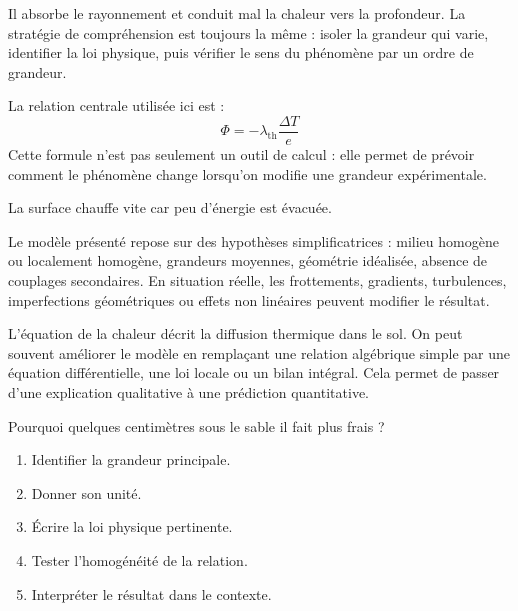 \documentclass[11pt,a4paper]{article}
\begin{document}
\begin{methodebox}
Il absorbe le rayonnement et conduit mal la chaleur vers la profondeur.
La stratégie de compréhension est toujours la même : isoler la grandeur qui varie, identifier la loi physique, puis vérifier le sens du phénomène par un ordre de grandeur.
\end{methodebox}

\begin{theorembox}
La relation centrale utilisée ici est :
\[
\Phi=-\lambda_{\mathrm{th}}\frac{\Delta T}{e}
\]
Cette formule n'est pas seulement un outil de calcul : elle permet de prévoir comment le phénomène change lorsqu'on modifie une grandeur expérimentale.
\end{theorembox}

\begin{odgbox}
La surface chauffe vite car peu d'énergie est évacuée.
\end{odgbox}

\begin{attentionbox}
Le modèle présenté repose sur des hypothèses simplificatrices : milieu homogène ou localement homogène, grandeurs moyennes, géométrie idéalisée, absence de couplages secondaires. En situation réelle, les frottements, gradients, turbulences, imperfections géométriques ou effets non linéaires peuvent modifier le résultat.
\end{attentionbox}

\begin{approfondissementbox}
L'équation de la chaleur décrit la diffusion thermique dans le sol.
On peut souvent améliorer le modèle en remplaçant une relation algébrique simple par une équation différentielle, une loi locale ou un bilan intégral. Cela permet de passer d'une explication qualitative à une prédiction quantitative.
\end{approfondissementbox}

\begin{exercicebox}
Pourquoi quelques centimètres sous le sable il fait plus frais ?
\begin{enumerate}
  \item Identifier la grandeur principale.
  \item Donner son unité.
  \item Écrire la loi physique pertinente.
  \item Tester l'homogénéité de la relation.
  \item Interpréter le résultat dans le contexte.
\end{enumerate}
\end{exercicebox}
\end{document}
